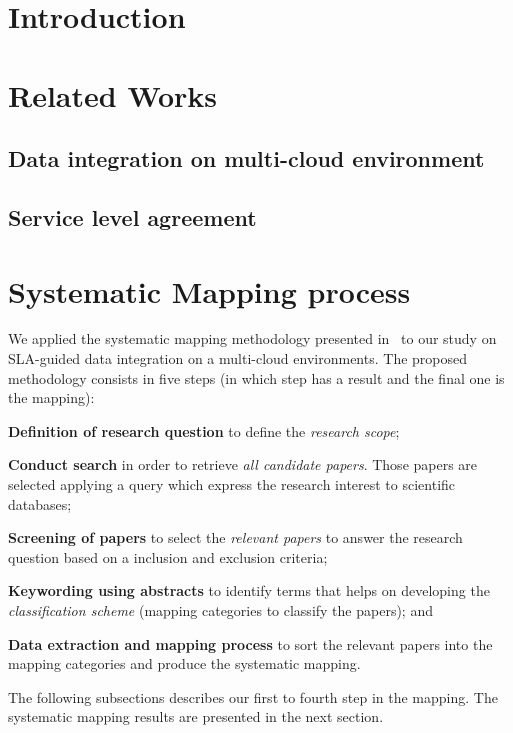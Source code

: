 \documentclass[preprint,12pt]{elsarticle}
\theoremstyle{plain}
\theoremstyle{plain}
\theoremstyle{plain}
\theoremstyle{plain}
\begin{document}
\section{Introduction}
\label{sec:intro}

\section{Related Works}

\subsection{Data integration on multi-cloud environment}

\subsection{Service level agreement}

\section{Systematic Mapping process}
We applied the systematic mapping methodology presented in~\cite{SM:Petersen:2008} to our study on SLA-guided data integration on a multi-cloud environments. 
The proposed methodology consists in five steps (in which step has a result and the final one is the mapping):
\begin{description}
\item \textbf{Definition of research question} to define the \textit{research scope};
\item \textbf{Conduct search} in order to retrieve \textit{all candidate papers}. Those papers are selected applying a query which express the research interest to scientific databases;
\item  \textbf{Screening of papers} to select the \textit{relevant papers} to answer the research question based on a inclusion and exclusion criteria;
\item \textbf{Keywording using abstracts} to identify terms that helps on developing the \textit{classification scheme} (mapping categories to classify the papers); and
\item \textbf{Data extraction and mapping process} to sort the relevant papers into the mapping categories and produce the systematic mapping.
\end{description}
\bigskip The following subsections describes our first to fourth step in the mapping. The systematic mapping results are presented in the next section.
\end{document}
